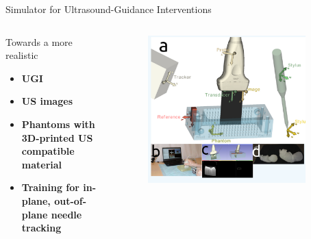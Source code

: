 {
\begin{frame}{Simulator for Ultrasound-Guidance Interventions}

  \begin{columns}
    \begin{column}{.3\linewidth}
      Towards a more realistic
  \begin{itemize}
    \item \textbf{UGI}
    \item \textbf{US images}
    \item \textbf{Phantoms with 3D-printed US compatible material}
    \item \textbf{Training for in-plane, out-of-plane needle tracking}
  \end{itemize}

    \end{column}


  \begin{column}{.6\linewidth}

      \begin{figure}
        \centering
        \includegraphics[width=0.9\textwidth]{./figures/simulator-for-ugi/versions/drawing-v01.png}
      \end{figure}

    \end{column}
  \end{columns}

\end{frame}
}